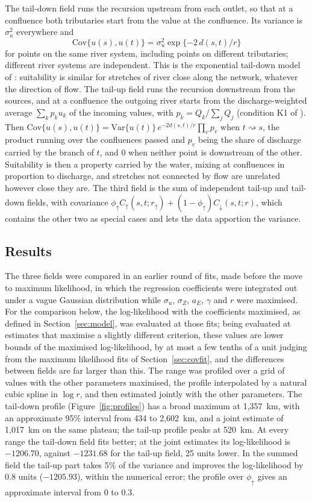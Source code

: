 \documentclass[11pt,a4paper]{article}
\newcommand{\Cov}{\mathrm{Cov}}
\newcommand{\Var}{\mathrm{Var}}
\begin{document}
The tail-down field runs the recursion upstream from each outlet, so that at a confluence both tributaries start from the value at the confluence. Its variance is $\sigma_u^2$ everywhere and
\[
\Cov\{u(s), u(t)\} = \sigma_u^2 \exp\{-2\,d(s, t)/r\}
\]
for points on the same river system, including points on different tributaries; different river systems are independent. This is the exponential tail-down model of \citet{verhoef2010}: suitability is similar for stretches of river close along the network, whatever the direction of flow. The tail-up field runs the recursion downstream from the sources, and at a confluence the outgoing river starts from the discharge-weighted average $\sum_k p_k u_k$ of the incoming values, with $p_k = Q_k / \sum_j Q_j$ (condition K1 of \citealp{bolin2026dir}). Then $\Cov\{u(s), u(t)\} = \Var\{u(t)\}\, e^{-2d(s,t)/r} \prod_v p_v$ when $t \rightsquigarrow s$, the product running over the confluences passed and $p_v$ being the share of discharge carried by the branch of $t$, and 0 when neither point is downstream of the other. Suitability is then a property carried by the water, mixing at confluences in proportion to discharge, and stretches not connected by flow are unrelated however close they are. The third field is the sum of independent tail-up and tail-down fields, with covariance $\phi_\uparrow C_\uparrow(s,t; r_\uparrow) + (1 - \phi_\uparrow) C_\downarrow(s,t; r)$, which contains the other two as special cases and lets the data apportion the variance.

\subsection*{Results}

The three fields were compared in an earlier round of fits, made before the move to maximum likelihood, in which the regression coefficients were integrated out under a vague Gaussian distribution while $\sigma_u$, $\sigma_Z$, $a_E$, $\gamma$ and $r$ were maximised. For the comparison below, the log-likelihood with the coefficients maximised, as defined in Section~\ref{sec:model}, was evaluated at those fits; being evaluated at estimates that maximise a slightly different criterion, these values are lower bounds of the maximised log-likelihood, by at most a few tenths of a unit judging from the maximum likelihood fits of Section~\ref{sec:covfit}, and the differences between fields are far larger than this. The range was profiled over a grid of values with the other parameters maximised, the profile interpolated by a natural cubic spline in $\log r$, and then estimated jointly with the other parameters. The tail-down profile (Figure~\ref{fig:profiles}) has a broad maximum at 1{,}357~km, with an approximate 95\% interval from 434 to 2{,}602~km, and a joint estimate of 1{,}017~km on the same plateau; the tail-up profile peaks at 520~km. At every range the tail-down field fits better; at the joint estimates its log-likelihood is $-1206.70$, against $-1231.68$ for the tail-up field, 25 units lower. In the summed field the tail-up part takes 5\% of the variance and improves the log-likelihood by 0.8 units ($-1205.93$), within the numerical error; the profile over $\phi_\uparrow$ gives an approximate interval from 0 to 0.3.
\end{document}
